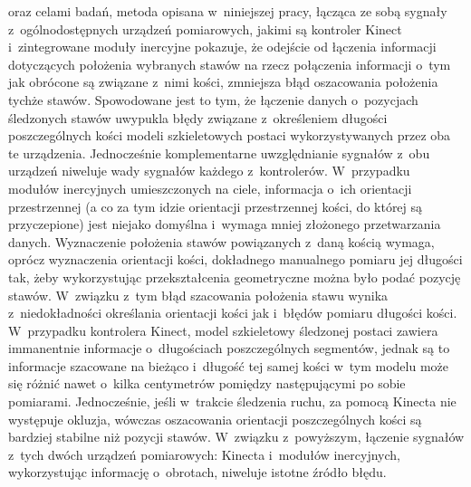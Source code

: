 oraz celami badań, metoda opisana w~niniejszej pracy, łącząca ze sobą sygnały z~ogólnodostępnych urządzeń pomiarowych, jakimi są kontroler Kinect i~zintegrowane moduły inercyjne pokazuje, że odejście od łączenia informacji dotyczących położenia wybranych stawów na rzecz połączenia informacji o~tym jak obrócone są związane z~nimi kości, zmniejsza błąd oszacowania położenia tychże stawów. Spowodowane jest to tym, że łączenie danych o~pozycjach śledzonych stawów uwypukla błędy związane z~określeniem długości poszczególnych kości modeli szkieletowych postaci wykorzystywanych przez oba te urządzenia. Jednocześnie komplementarne uwzględnianie sygnałów z~obu urządzeń niweluje wady sygnałów każdego z~kontrolerów. W~przypadku modułów inercyjnych umieszczonych na ciele, informacja o~ich orientacji przestrzennej (a co za tym idzie orientacji przestrzennej kości, do której są przyczepione) jest niejako domyślna i~wymaga mniej złożonego przetwarzania danych. Wyznaczenie położenia stawów powiązanych z~daną kością wymaga, oprócz wyznaczenia orientacji kości, dokładnego manualnego pomiaru jej długości tak, żeby wykorzystując przekształcenia geometryczne można było podać pozycję stawów. W~związku z~tym błąd szacowania położenia stawu wynika z~niedokładności określania orientacji kości jak i~błędów pomiaru długości kości. W~przypadku kontrolera Kinect, model szkieletowy śledzonej postaci zawiera immanentnie informacje o~długościach poszczególnych segmentów, jednak są to informacje szacowane na bieżąco i~długość tej samej kości w~tym modelu może się różnić nawet o~kilka centymetrów pomiędzy następującymi po sobie pomiarami. Jednocześnie, jeśli w~trakcie śledzenia ruchu, za pomocą Kinecta nie występuje okluzja, wówczas oszacowania orientacji poszczególnych kości są bardziej stabilne niż pozycji stawów. W~związku z~powyższym, łączenie sygnałów z~tych dwóch urządzeń pomiarowych: Kinecta i~modułów inercyjnych, wykorzystując informację o~obrotach, niweluje istotne źródło błędu.

